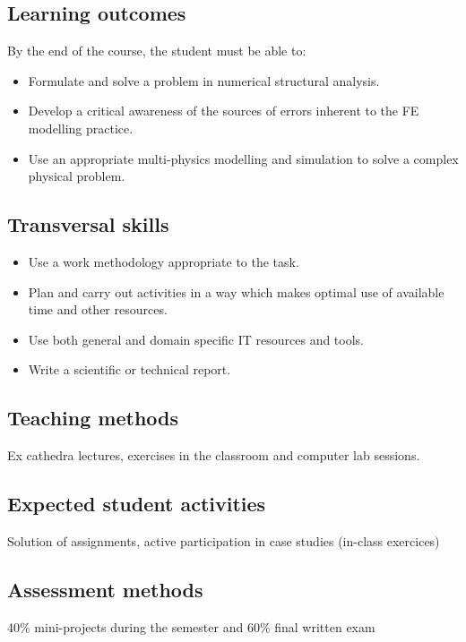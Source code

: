 \documentclass[11pt]{amsart}
\begin{document}
\subsection*{Learning outcomes}
By the end of the course, the student must be able to:
\begin{itemize}
\item Formulate and solve a problem in numerical structural analysis.
\item Develop a critical awareness of the sources of errors inherent to the FE modelling practice.
\item Use an appropriate multi-physics modelling and simulation to solve a complex physical problem.
\end{itemize}

\subsection*{Transversal skills}
\begin{itemize}
\item Use a work methodology appropriate to the task.
\item Plan and carry out activities in a way which makes optimal use of available time and other resources.
\item Use both general and domain specific IT resources and tools.
\item Write a scientific or technical report.
\end{itemize}

\subsection*{Teaching methods}
Ex cathedra lectures, exercises in the classroom and computer lab sessions.

\subsection*{Expected student activities}
Solution of assignments, active participation in case studies (in-class exercices)


\subsection*{Assessment methods}
40\% mini-projects during the semester and 60\% final written exam
\end{document}
